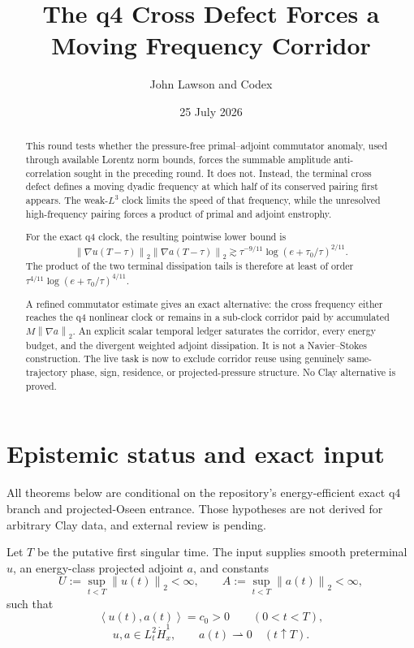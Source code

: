 \documentclass[11pt]{article}
\title{The q4 Cross Defect Forces a Moving Frequency Corridor}
\author{John Lawson and Codex}
\date{25 July 2026}
\theoremstyle{remark}
\newcommand{\norm}[1]{\left\|#1\right\|}
\newcommand{\ip}[2]{\left\langle#1,#2\right\rangle}
\begin{document}
\maketitle

\begin{abstract}
This round tests whether the pressure-free primal--adjoint commutator
anomaly, used through available Lorentz norm bounds, forces the summable
amplitude anti-correlation sought in the preceding round.  It does not.
Instead, the terminal cross defect defines a moving dyadic frequency at
which half of its conserved pairing first appears.  The weak-\(L^3\)
clock limits the speed of that frequency, while the unresolved
high-frequency pairing forces a product of primal and adjoint enstrophy.

For the exact q4 clock, the resulting pointwise lower bound is
\[
 \norm{\nabla u(T-\tau)}_2
 \norm{\nabla a(T-\tau)}_2
 \gtrsim
 \tau^{-9/11}
 \log(e+\tau_0/\tau)^{2/11}.
\]
The product of the two terminal dissipation tails is therefore at least
of order
\(\tau^{4/11}\log(e+\tau_0/\tau)^{4/11}\).

A refined commutator estimate gives an exact alternative: the cross
frequency either reaches the q4 nonlinear clock or remains in a
sub-clock corridor paid by accumulated \(M\norm{\nabla a}_2\).
An explicit scalar temporal ledger saturates the corridor, every energy
budget, and the divergent weighted adjoint dissipation.  It is not a
Navier--Stokes construction.  The live task is now to exclude corridor
reuse using genuinely same-trajectory phase, sign, residence, or
projected-pressure structure.  No Clay alternative is proved.
\end{abstract}

\section{Epistemic status and exact input}

All theorems below are conditional on the repository's energy-efficient
exact q4 branch and projected-Oseen entrance.  Those hypotheses are not
derived for arbitrary Clay data, and external review is pending.

Let \(T\) be the putative first singular time.  The input supplies smooth
preterminal \(u\), an energy-class projected adjoint \(a\), and constants
\[
 U:=\sup_{t<T}\norm{u(t)}_2<\infty,
 \qquad
 A:=\sup_{t<T}\norm{a(t)}_2<\infty,
\]
such that
\begin{equation}
\label{eq:pairing}
 \ip{u(t)}{a(t)}=c_0>0
 \qquad(0<t<T),
\end{equation}
\[
 u,a\in L^2_t\dot H^1_x,
 \qquad
 a(t)\rightharpoonup0
 \quad(t\uparrow T).
\]
\end{document}
